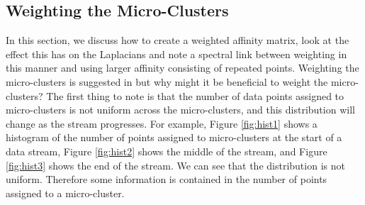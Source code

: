 \subsection{Weighting the Micro-Clusters}
\label{sec:weighting}

In this section, we discuss how to create a weighted affinity matrix, look at the effect this has on the Laplacians and note a spectral link between weighting in this manner and using larger affinity consisting of repeated points.
Weighting the micro-clusters is suggested in \cite{Zhang1996a} but why might it be beneficial to weight the micro-clusters?  The first thing to note is that the number of data points assigned to micro-clusters is not uniform across the micro-clusters, and this distribution will change as the stream progresses.  For example, Figure \ref{fig:hist1} shows a histogram of the number of points assigned to micro-clusters at the start of a data stream, Figure \ref{fig:hist2} shows the middle of the stream, and Figure \ref{fig:hist3} shows the end of the stream. We can see that the distribution is not uniform. Therefore some information is contained in the number of points assigned to a micro-cluster. 

